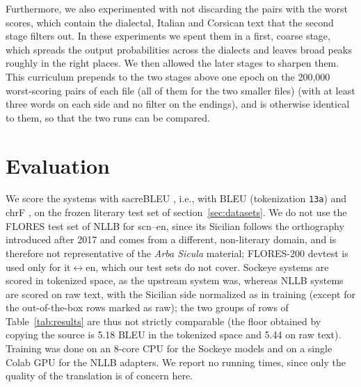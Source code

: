 \documentclass[11pt,a4paper]{article}
\begin{document}
Furthermore, we also experimented with not discarding the pairs with the worst scores,
which contain the dialectal, Italian and Corsican text that the second stage filters out.
In these experiments we spent them in a first, coarse stage, which spreads the output probabilities
across the dialects and leaves broad peaks roughly in the right places.
We then allowed the later stages to sharpen them.
This curriculum prepends to the two stages above one epoch on the
200{,}000 worst-scoring pairs of each file (all of them for the two smaller files)
(with at least three words on each side and no filter on the endings),
and is otherwise identical to them, so that the two runs can be compared.



\section{Evaluation}
\label{sec:evaluation}
We score the systems with sacreBLEU \citep{post2018sacrebleu}, i.e., with BLEU
\citep{papineni2002bleu} (tokenization \texttt{13a}) and chrF \citep{popovic2015chrf}, on the
frozen literary test set of section~\ref{sec:datasets}. We do not use the FLORES test set of NLLB
for scn--en, since its Sicilian follows the orthography introduced after 2017 and comes from a
different, non-literary domain, and is therefore not representative of the \emph{Arba Sicula}
material; FLORES-200 devtest is used only for it$\leftrightarrow$en, which our test sets do not
cover. Sockeye systems are scored in tokenized space, as the upstream system was, whereas NLLB systems are scored on raw text, with the Sicilian side normalized as in training (except for the out-of-the-box rows marked as raw); the two groups of rows of Table~\ref{tab:results} are thus not strictly
comparable (the floor obtained by copying the source is 5.18 BLEU in the tokenized space and 5.44 on raw text). Training was
done on an 8-core CPU for the Sockeye models and on a single Colab GPU for the NLLB adapters. We
report no running times, since only the quality of the translation is of concern here.
\end{document}
